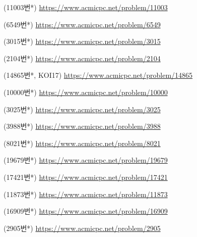\begin{problem}
    (11003번*) \url{https://www.acmicpc.net/problem/11003}
\end{problem}
\begin{problem}
    (6549번*) \url{https://www.acmicpc.net/problem/6549}
\end{problem}
\begin{problem}
    (3015번*) \url{https://www.acmicpc.net/problem/3015}
\end{problem}
\begin{problem}
    (2104번*) \url{https://www.acmicpc.net/problem/2104}
\end{problem}
\begin{problem}
    (14865번*, KOI17) \url{https://www.acmicpc.net/problem/14865}
\end{problem}
\begin{problem}
    (10000번*) \url{https://www.acmicpc.net/problem/10000}
\end{problem}
\begin{problem}
    (3025번*) \url{https://www.acmicpc.net/problem/3025}
\end{problem}
\begin{problem}
    (3988번*) \url{https://www.acmicpc.net/problem/3988}
\end{problem}
\begin{problem}
    (8021번*) \url{https://www.acmicpc.net/problem/8021}
\end{problem}
\begin{problem}
    (19679번*) \url{https://www.acmicpc.net/problem/19679}
\end{problem}
\begin{problem}
    (17421번*) \url{https://www.acmicpc.net/problem/17421}
\end{problem}
\begin{problem}
    (11873번*) \url{https://www.acmicpc.net/problem/11873}
\end{problem}
\begin{problem}
    (16909번*) \url{https://www.acmicpc.net/problem/16909}
\end{problem}
\begin{problem}
    (2905번*) \url{https://www.acmicpc.net/problem/2905}
\end{problem}

